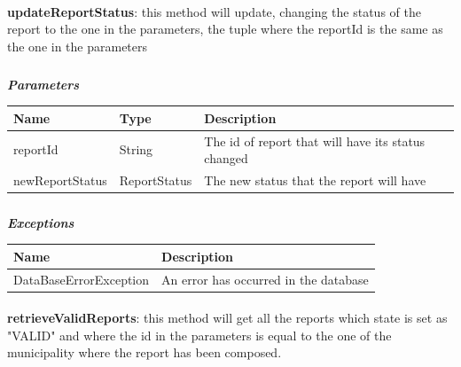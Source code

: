 					\paragraph{}
							\textbf{updateReportStatus}: this method will update, changing the status of the report to the one in the parameters, the tuple where the reportId is the same as the one in the parameters
							\subparagraph{}
							\textit{\textbf{Parameters}}
								\begin{table}[!h]
									\begin{tabular}{L{0.2\textwidth}L{0.2\textwidth}L{0.2\textwidth}}
										\toprule
										Name & Type & Description \\
										\midrule
								  		reportId & String & The id of report that will have its status changed \\
								  		newReportStatus & ReportStatus & The new status that the report will have \\
								 		\bottomrule
									\end{tabular}
								\end{table}
							\subparagraph{}
								\textit{\textbf{Exceptions}}
									\begin{table}[!h]
									\begin{tabular}{L{0.3\textwidth}L{0.3\textwidth}}
										\toprule
										Name & Description \\
										\midrule
								  		DataBaseErrorException & An error has occurred in the database \\
								 		\bottomrule
									\end{tabular}
								\end{table}
						
					\paragraph{}
							\textbf{retrieveValidReports}: this method will get all the reports which state is set as "VALID" and where the id in the parameters is equal to the one of the municipality where the report has been composed.
							
